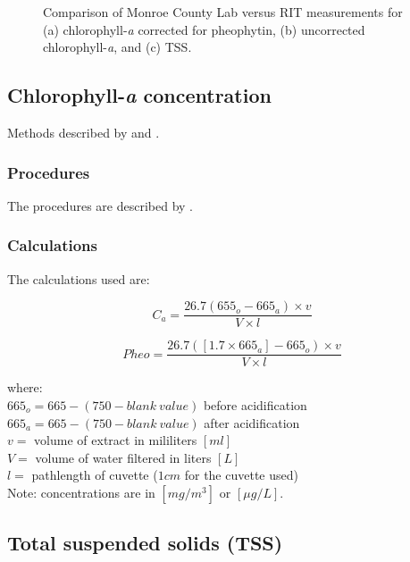 \begin{appendices}
\begin{figure}[htb!]
  \caption{Comparison of Monroe County Lab versus RIT measurements for (a) chlorophyll-{\it a} corrected for pheophytin, (b) uncorrected chlorophyll-{\it a}, and (c) TSS. \label{fig:RIT_County_Comp} } 
\end{figure}

\subsection{Chlorophyll-{\it a} concentration}

Methods described by \citet{Lorenzen:1967fk} and \citet{Ritchie:2008eu}.
\subsubsection{Procedures}
The procedures are described by \citet{Tyler2013_chl_protocol}.

\subsubsection{Calculations}

The calculations used \citep{Lorenzen:1967fk} are:

\begin{equation}
  C_a = \frac{26.7(655_o - 665_a)\times v}{V\times l}
\end{equation}

\begin{equation}
  Pheo = \frac{26.7([1.7\times 665_a]-665_o)\times v}{V\times l}
\end{equation}

\noindent where: \\
$665_o = 665 - (750-blank~value)$ before acidification\\
$665_a = 665 - (750-blank~value)$ after acidification  \\
$v = $ volume of extract in mililiters $[ml]$ \\
$V = $ volume of water filtered in liters $[L]$ \\
$l = $ pathlength of cuvette ($1cm$ for the cuvette used) \\

Note: concentrations are in $[mg/m^3]$ or $[\mu g/L]$.


\subsection{Total suspended solids (TSS)}


\end{appendices}
